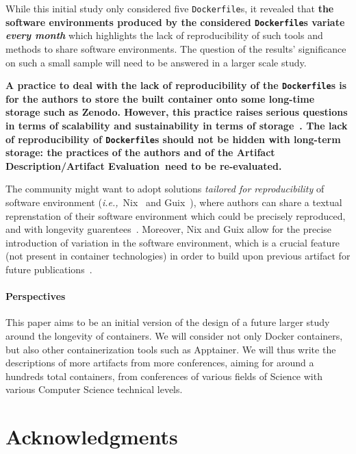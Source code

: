 \documentclass[sigconf,natbib=false]{acmart}
\newcommand{\ie}{\emph{i.e.,}}
\newcommand{\ad}{Artifact Description}
\newcommand{\aeval}{Artifact Evaluation}
\newcommand{\adae}{\ad/\aeval}
\newcommand{\df}{\texttt{Dockerfile}}
\begin{document}
While this initial study only considered five \df s, it revealed that \textbf{the software environments produced by the considered \df s variate \emph{every month}} which highlights the lack of reproducibility of such tools and methods to share software environments.
The question of the results' significance on such a small sample will need to be answered in a larger scale study.

\textbf{
  A practice to deal with the lack of reproducibility of the \df s is for the authors to store the built container onto some long-time storage such as Zenodo.
  However, this practice raises serious questions in terms of scalability and sustainability in terms of storage~\cite{monroe2023preservation}.
  The lack of reproducibility of \df s should not be hidden with long-term storage: the practices of the authors and of the \adae\ need to be re-evaluated.
}

The community might want to adopt solutions \emph{tailored for reproducibility} of software environment (\ie\ Nix~\cite{dolstra_nix_2004} and Guix~\cite{courtes_functional_2013}), where authors can share a textual reprenstation of their software environment which could be precisely reproduced, and with longevity guarentees~\cite{courtes2024source}.
Moreover, Nix and Guix allow for the precise introduction of variation in the software environment, which is a crucial feature (not present in container technologies) in order to build upon previous artifact for future publications~\cite{mercier2018considering}.

\paragraph{Perspectives}

This paper aims to be an initial version of the design of a future larger study around the longevity of containers.
We will consider not only Docker containers, but also other containerization tools such as Apptainer.
We will thus write the descriptions of more artifacts from more conferences, aiming for around a hundreds total containers, from conferences of various fields of Science with various Computer Science technical levels.


%

\section*{Acknowledgments}
\end{document}
